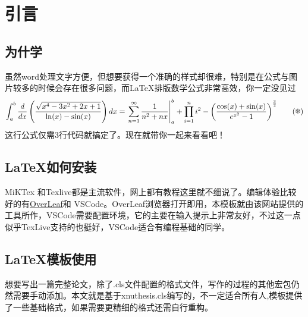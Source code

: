 \section{引言}
\subsection{为什学~\LaTeXe}
虽然word处理文字方便，但想要获得一个准确的样式却很难，特别是在公式与图片较多的时候会存在很多问题，而\LaTeX 排版数学公式非常高效，你一定没见过
\begin{equation}
\int_{a}^{b} \frac{d}{dx}\left( \frac{\sqrt{x^4 - 3x^2 + 2x + 1}}{\ln(x) - \sin(x)} \right) dx =
\left. \sum_{n=1}^{\infty} \frac{1}{n^2 + nx} \right|_{a}^{b} +
\prod_{i=1}^{n} i^2 - \bigg( \frac{\cos(x) + \sin(x)}{e^{x^2} - 1} \bigg)^{\frac{3}{2}} 
\tag{\ding{100}}
\end{equation}
这行公式仅需3行代码就搞定了。现在就带你一起来看看吧！
\subsection{\LaTeX 如何安装}
MiKTex 和Texlive都是主流软件，网上都有教程这里就不细说了。编辑体验比较好的有\href{https://cn.overleaf.com}{OverLeaf}和
VSCode。OverLeaf浏览器打开即用，本模板就由该网站提供的工具所作，VSCode需要配置环境，它的主要在输入提示上非常友好，不过这一点似乎TexLive支持的也挺好，VSCode适合有编程基础的同学。
\subsection{\LaTeX 模板使用}
想要写出一篇完整论文，除了.cls文件配置的格式文件，写作的过程的其他宏包仍然需要手动添加。本文就是基于xnuthesis.cls编写的，不一定适合所有人,模板提供了一些基础格式，如果需要更精细的格式还需自行重构。


